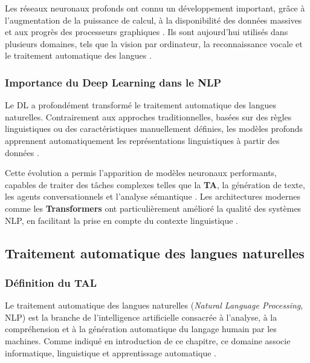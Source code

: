 Les réseaux neuronaux profonds ont connu un développement important, grâce à l'augmentation de la puissance de calcul, à la disponibilité des données massives et aux progrès des processeurs graphiques \cite{Goodfellow-et-al-2016}. Ils sont aujourd'hui utilisés dans plusieurs domaines, tels que la vision par ordinateur, la reconnaissance vocale et le traitement automatique des langues \cite{ranathunga2023neural}.

\subsubsection{Importance du Deep Learning dans le \ac{NLP}}

Le \ac{DL} a profondément transformé le traitement automatique des langues naturelles. Contrairement aux approches traditionnelles, basées sur des règles linguistiques ou des caractéristiques manuellement définies, les modèles profonds apprennent automatiquement les représentations linguistiques à partir des données \cite{Goodfellow-et-al-2016, ranathunga2023neural}.

Cette évolution a permis l'apparition de modèles neuronaux performants, capables de traiter des tâches complexes telles que la \textbf{\ac{TA}}, la génération de texte, les agents conversationnels et l'analyse sémantique \cite{ranathunga2023neural, agyei2025dynamic}. Les architectures modernes comme les \textbf{Transformers} ont particulièrement amélioré la qualité des systèmes \ac{NLP}, en facilitant la prise en compte du contexte linguistique \cite{vaswani2017attention}.

\subsection{Traitement automatique des langues naturelles}
\label{sec:tal-def}

\subsubsection{Définition du \ac{TAL}}

Le traitement automatique des langues naturelles (\textit{Natural Language Processing}, \ac{NLP}) est la branche de l'intelligence artificielle consacrée à l'analyse, à la compréhension et à la génération automatique du langage humain par les machines. Comme indiqué en introduction de ce chapitre, ce domaine associe informatique, linguistique et apprentissage automatique \cite{ranathunga2023neural}.

